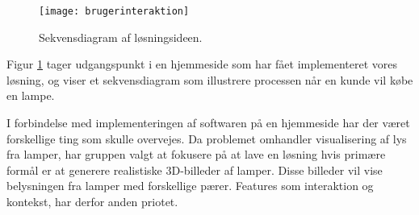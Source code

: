 \begin{figure}[H]
   \centering
   \texttt{[image: brugerinteraktion]}
   \caption{Sekvensdiagram af løsningsideen.}
   \label{fig:sekvensdiagram_af_ideen}
\end{figure}

Figur \ref{fig:sekvensdiagram_af_ideen} tager udgangspunkt i en hjemmeside som har fået implementeret vores løsning, og viser et sekvensdiagram som illustrere processen når en kunde vil købe en lampe.  

I forbindelse med implementeringen af softwaren på en hjemmeside har der været forskellige ting som skulle overvejes. Da problemet omhandler visualisering af lys fra lamper, har gruppen valgt at fokusere på at lave en løsning hvis primære formål er at generere realistiske 3D-billeder af lamper. Disse billeder vil vise belysningen fra lamper med forskellige pærer. Features som interaktion og kontekst, har derfor anden priotet. 

